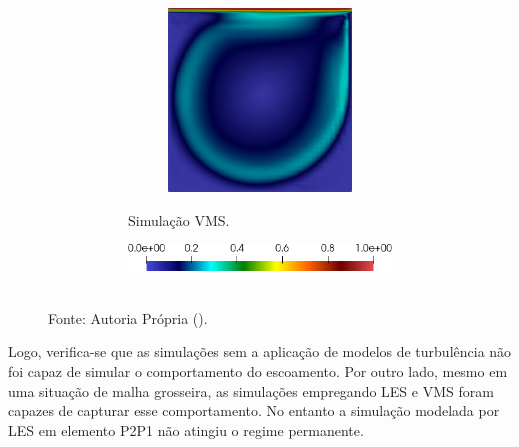 \begin{figure}[h!]
\begin{subfigure}{\textwidth}
\begin{subfigure}{\textwidth}
\begin{subfigure}{.32\textwidth}
            \end{subfigure}
            \begin{subfigure}{.32\textwidth}
                \includegraphics[width=\linewidth]{Figuras/cavity-poor/VMS-TH.png}
            \end{subfigure}
            \caption{Simulação VMS.}
        \end{subfigure}
        \begin{subfigure}{.5\textwidth}\centering
            \includegraphics[width=\linewidth]{Figuras/cavity-poor/legenda.png}
        \end{subfigure}
    \end{subfigure}
    \label{fig:cavity-coarse}
    \\Fonte: Autoria Própria (\the\year).
\end{figure}

Logo, verifica-se que as simulações sem a aplicação de modelos de turbulência não foi capaz de simular o comportamento do escoamento. Por outro lado, mesmo em uma situação de malha grosseira, as simulações empregando LES e VMS foram capazes de capturar esse comportamento. No entanto a simulação modelada por LES em elemento P2P1 não atingiu o regime permanente.